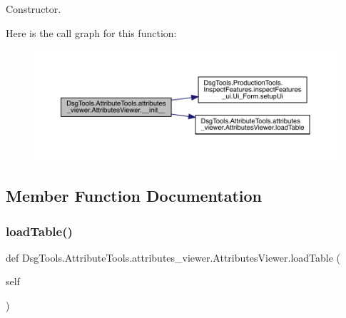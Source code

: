 \begin{DoxyVerb}Constructor.\end{DoxyVerb}
 Here is the call graph for this function\+:
\nopagebreak
\begin{figure}[H]
\begin{center}
\leavevmode
\includegraphics[width=350pt]{class_dsg_tools_1_1_attribute_tools_1_1attributes__viewer_1_1_attributes_viewer_a2a5d9367e9c1f57653f77e80fe4d8878_cgraph}
\end{center}
\end{figure}


\subsection{Member Function Documentation}
\mbox{\label{class_dsg_tools_1_1_attribute_tools_1_1attributes__viewer_1_1_attributes_viewer_aeb49b4d97a0b53de38bbe02c3d82c976}} 
\subsubsection{\texorpdfstring{load\+Table()}{loadTable()}}
{\footnotesize\ttfamily def Dsg\+Tools.\+Attribute\+Tools.\+attributes\+\_\+viewer.\+Attributes\+Viewer.\+load\+Table (\begin{DoxyParamCaption}\item[{}]{self }\end{DoxyParamCaption})}

